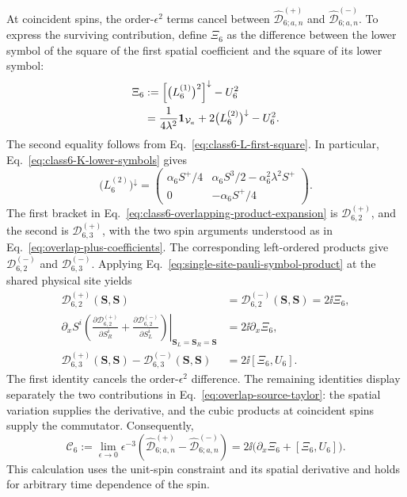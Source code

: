 At coincident spins, the order-$\epsilon^2$ terms cancel between
$\widehat{\mathcal D}^{(+)}_{6;a,n}$ and
$\widehat{\mathcal D}^{(-)}_{6;a,n}$.  To express the surviving contribution,
define $\Xi_6$ as the difference between the lower symbol of the square of
the first spatial coefficient and the square of its lower symbol:
\begin{align}
\Xi_6
&:=\left[\bigl(L_6^{(1)}\bigr)^2\right]^\downarrow-U_6^2
\nonumber\\
&=\frac{1}{4\lambda^2}\mathbf{1}_{\mathcal V_a}
+2\bigl(L_6^{(2)}\bigr)^\downarrow-U_6^2.
\label{eq:class6-symbol-square-difference}
\end{align}
The second equality follows from Eq.~\eqref{eq:class6-L-first-square}.
In particular, Eq.~\eqref{eq:class6-K-lower-symbols} gives
\begin{equation}
\bigl(L_6^{(2)}\bigr)^\downarrow
=\begin{pmatrix}
\alpha_6 S^+/4&\alpha_6 S^3/2-\alpha_6^2\lambda^2S^+\\
0&-\alpha_6 S^+/4
\end{pmatrix}.
\label{eq:class6-second-spatial-lower-symbol}
\end{equation}
The first bracket in Eq.~\eqref{eq:class6-overlapping-product-expansion}
is $\mathcal D^{(+)}_{6,2}$, and the second is
$\mathcal D^{(+)}_{6,3}$, with the two spin arguments understood as
in Eq.~\eqref{eq:overlap-plus-coefficients}.  The corresponding
left-ordered products give $\mathcal D^{(-)}_{6,2}$ and
$\mathcal D^{(-)}_{6,3}$.  Applying
Eq.~\eqref{eq:single-site-pauli-symbol-product} at the shared physical
site yields
\begin{align}
\mathcal D^{(+)}_{6,2}(\boldsymbol S,\boldsymbol S)
&=\mathcal D^{(-)}_{6,2}(\boldsymbol S,\boldsymbol S)=2\ii\Xi_6,
\label{eq:class6-coincident-quadratic-overlap}\\
\partial_x S^i
\left.
\left(
\frac{\partial\mathcal D^{(+)}_{6,2}}{\partial S_R^i}
+\frac{\partial\mathcal D^{(-)}_{6,2}}{\partial S_L^i}
\right)\right|_{\boldsymbol S_L=\boldsymbol S_R=\boldsymbol S}
&=2\ii\partial_x\Xi_6,
\label{eq:class6-quadratic-overlap-taylor}\\
\mathcal D^{(+)}_{6,3}(\boldsymbol S,\boldsymbol S)
-\mathcal D^{(-)}_{6,3}(\boldsymbol S,\boldsymbol S)
&=2\ii[\Xi_6,U_6].
\label{eq:class6-coincident-cubic-overlap}
\end{align}
The first identity cancels the order-$\epsilon^2$ difference.  The
remaining identities display separately the two contributions in
Eq.~\eqref{eq:overlap-source-taylor}: the spatial variation supplies
the derivative, and the cubic products at coincident spins supply
the commutator.  Consequently,
\begin{equation}
\mathcal C_6
:=\lim_{\epsilon\to0}\epsilon^{-3}
\left(\widehat{\mathcal D}^{(+)}_{6;a,n}
-\widehat{\mathcal D}^{(-)}_{6;a,n}\right)
=2\ii\bigl(\partial_x\Xi_6+[\Xi_6,U_6]\bigr).
\label{eq:class6-shared-site-correction}
\end{equation}
This calculation uses the unit-spin constraint and its spatial derivative
and holds for arbitrary time dependence of the spin.

